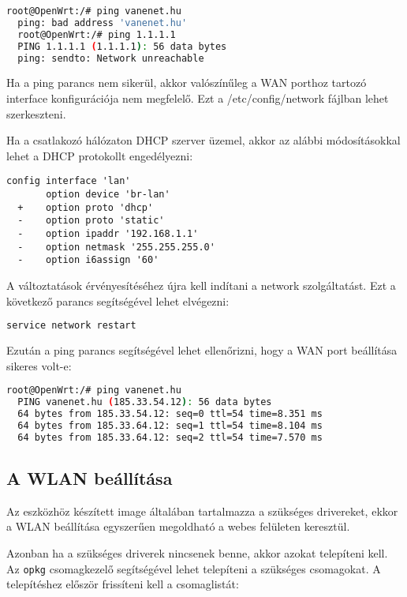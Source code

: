 \documentclass[12pt]{article}
\begin{document}
\begin{lstlisting}[language=Bash]
  root@OpenWrt:/# ping vanenet.hu
  ping: bad address 'vanenet.hu'
  root@OpenWrt:/# ping 1.1.1.1
  PING 1.1.1.1 (1.1.1.1): 56 data bytes
  ping: sendto: Network unreachable
\end{lstlisting}

Ha a ping parancs nem sikerül, akkor valószínűleg a WAN porthoz tartozó interface konfigurációja nem megfelelő. Ezt a /etc/config/network fájlban lehet szerkeszteni.

Ha a csatlakozó hálózaton DHCP szerver üzemel, akkor az alábbi módosításokkal lehet a DHCP protokollt engedélyezni:

\begin{lstlisting}[]
  config interface 'lan'
       option device 'br-lan'
  +    option proto 'dhcp'
  -    option proto 'static'
  -    option ipaddr '192.168.1.1'
  -    option netmask '255.255.255.0'
  -    option i6assign '60'
\end{lstlisting}

A változtatások érvényesítéséhez újra kell indítani a network szolgáltatást. Ezt a következő parancs segítségével lehet elvégezni:

\begin{lstlisting}[language=Bash]
   service network restart
\end{lstlisting}

Ezután a ping parancs segítségével lehet ellenőrizni, hogy a WAN port beállítása sikeres volt-e:

\begin{lstlisting}[language=Bash]
  root@OpenWrt:/# ping vanenet.hu
  PING vanenet.hu (185.33.54.12): 56 data bytes
  64 bytes from 185.33.54.12: seq=0 ttl=54 time=8.351 ms
  64 bytes from 185.33.64.12: seq=1 ttl=54 time=8.104 ms
  64 bytes from 185.33.64.12: seq=2 ttl=54 time=7.570 ms
\end{lstlisting}


\subsection{A WLAN beállítása}

Az eszközhöz készített image általában tartalmazza a szükséges drivereket, ekkor a WLAN beállítása egyszerűen megoldható a webes felületen keresztül.

Azonban ha a szükséges driverek nincsenek benne, akkor azokat telepíteni kell. Az \texttt{opkg} csomagkezelő segítségével lehet telepíteni a szükséges csomagokat. A telepítéshez először frissíteni kell a csomaglistát:
\end{document}
